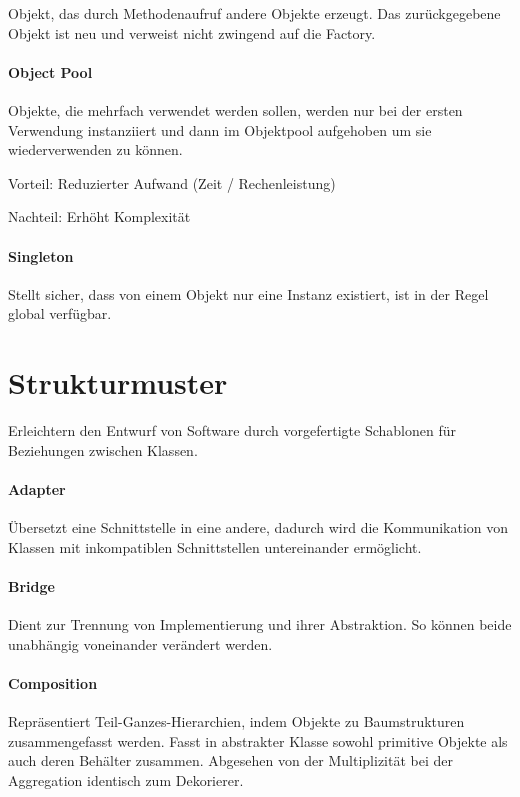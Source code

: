 Objekt, das durch Methodenaufruf andere Objekte erzeugt. Das zurückgegebene
Objekt ist neu und verweist nicht zwingend auf die Factory.

\paragraph{Object Pool}\label{object-pool}

Objekte, die mehrfach verwendet werden sollen, werden nur bei der ersten
Verwendung instanziiert und dann im Objektpool aufgehoben um sie
wiederverwenden zu können.

Vorteil: Reduzierter Aufwand (Zeit / Rechenleistung)

Nachteil: Erhöht Komplexität

\paragraph{Singleton}\label{singleton}

Stellt sicher, dass von einem Objekt nur eine Instanz existiert, ist in der
Regel global verfügbar.

\section{Strukturmuster}\label{strukturmuster}
Erleichtern den Entwurf von Software durch vorgefertigte Schablonen für
Beziehungen zwischen Klassen.

\paragraph{Adapter}\label{adapter}

Übersetzt eine Schnittstelle in eine andere, dadurch wird die Kommunikation von
Klassen mit inkompatiblen Schnittstellen untereinander ermöglicht.

\paragraph{Bridge}\label{bridge}

Dient zur Trennung von Implementierung und ihrer Abstraktion. So können beide
unabhängig voneinander verändert werden.

\paragraph{Composition}\label{composition}

Repräsentiert Teil-Ganzes-Hierarchien, indem Objekte zu Baumstrukturen
zusammengefasst werden. Fasst in abstrakter Klasse sowohl primitive Objekte als
auch deren Behälter zusammen.
Abgesehen von der Multiplizität bei der Aggregation identisch zum Dekorierer.


